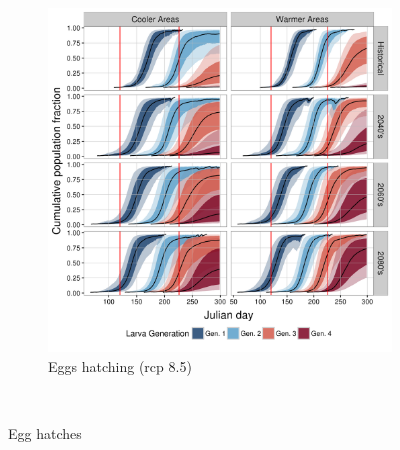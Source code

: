 \documentclass[12pt]{article}
\theoremstyle{plain}
\theoremstyle{definition}
\theoremstyle{definition}
\begin{document}
\begin{figure}[h!]
\begin{subfigure}[b]{0.48\textwidth}
        \includegraphics[width=\textwidth]{figures/eggHatch_rcp85}
        \caption{Eggs hatching (rcp 8.5)}
        \label{fig:Eggs_Hatch_85}
    \end{subfigure}\\
   \caption{Egg hatches}\label{fig:Egg_hatchs}
\end{figure}
\end{document}
